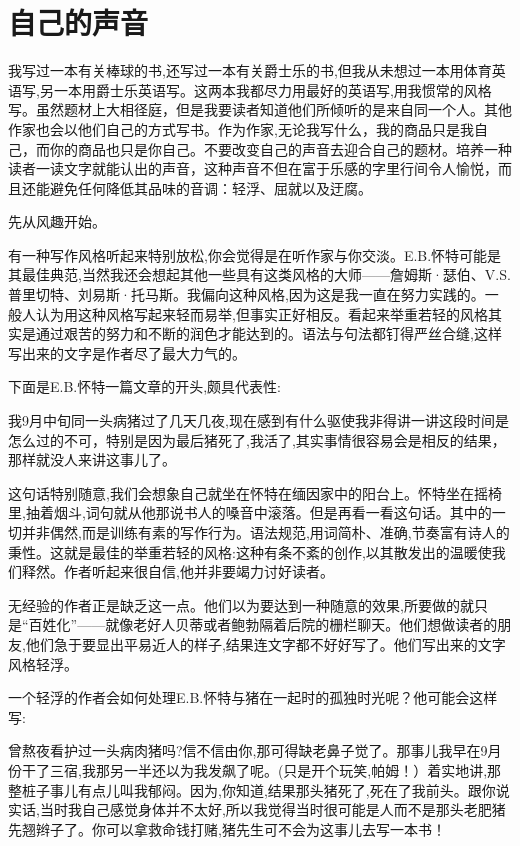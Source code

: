 \chapter{自己的声音}
我写过一本有关棒球的书,还写过一本有关爵士乐的书,但我从未想过一本用体育英语写,另一本用爵士乐英语写。这两本我都尽力用最好的英语写,用我惯常的风格写。虽然题材上大相径庭，但是我要读者知道他们所倾听的是来自同一个人。其他作家也会以他们自己的方式写书。作为作家,无论我写什么，我的商品只是我自己，而你的商品也只是你自己。不要改变自己的声音去迎合自己的题材。培养一种读者一读文字就能认出的声音，这种声音不但在富于乐感的字里行间令人愉悦，而且还能避免任何降低其品味的音调：轻浮、屈就以及迂腐。


先从风趣开始。

有一种写作风格听起来特别放松,你会觉得是在听作家与你交淡。E.B.怀特可能是其最佳典范,当然我还会想起其他一些具有这类风格的大师——詹姆斯·瑟伯、V.S.普里切特、刘易斯·托马斯。我偏向这种风格,因为这是我一直在努力实践的。一般人认为用这种风格写起来轻而易举,但事实正好相反。看起来举重若轻的风格其实是通过艰苦的努力和不断的润色才能达到的。语法与句法都钉得严丝合缝,这样写出来的文字是作者尽了最大力气的。

下面是E.B.怀特一篇文章的开头,颇具代表性:

我9月中旬同一头病猪过了几天几夜,现在感到有什么驱使我非得讲一讲这段时间是怎么过的不可，特别是因为最后猪死了,我活了,其实事情很容易会是相反的结果，那样就没人来讲这事儿了。

这句话特别随意,我们会想象自己就坐在怀特在缅因家中的阳台上。怀特坐在摇椅里,抽着烟斗,词句就从他那说书人的嗓音中滚落。但是再看一看这句话。其中的一切并非偶然,而是训练有素的写作行为。语法规范,用词简朴、准确,节奏富有诗人的秉性。这就是最佳的举重若轻的风格:这种有条不紊的创作,以其散发出的温暖使我们释然。作者听起来很自信,他并非要竭力讨好读者。

无经验的作者正是缺乏这一点。他们以为要达到一种随意的效果,所要做的就只是“百姓化”——就像老好人贝蒂或者鲍勃隔着后院的栅栏聊天。他们想做读者的朋友,他们急于要显出平易近人的样子,结果连文字都不好好写了。他们写出来的文字风格轻浮。

一个轻浮的作者会如何处理E.B.怀特与猪在一起时的孤独时光呢？他可能会这样写:

曾熬夜看护过一头病肉猪吗?信不信由你,那可得缺老鼻子觉了。那事儿我早在9月份干了三宿,我那另一半还以为我发飙了呢。(只是开个玩笑,帕姆！）着实地讲,那整桩子事儿有点儿叫我郁闷。因为,你知道,结果那头猪死了,死在了我前头。跟你说实话,当时我自己感觉身体并不太好,所以我觉得当时很可能是人而不是那头老肥猪先翘辫子了。你可以拿救命钱打赌,猪先生可不会为这事儿去写一本书！

